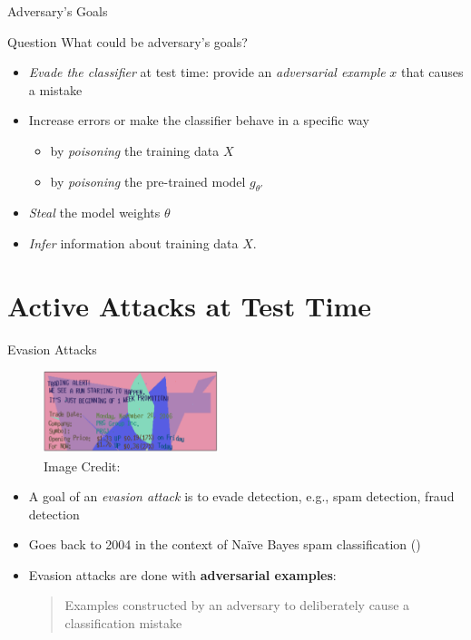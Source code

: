 \documentclass[10pt]{beamer}
\begin{document}
\begin{frame}[fragile]{Adversary's Goals}
  \centering
  

  \begin{alertblock}{Question}
    What could be adversary's goals?
  \end{alertblock}

  \pause

  \begin{itemize}[<+-| alert@+>]
    \item \emph{Evade the classifier} at test time: provide an \emph{adversarial example} $x$ that
      causes a mistake
    \pause
    \item Increase errors or make the classifier behave in a specific way
    \begin{itemize}
      \item by \emph{poisoning} the training data $X$
      \item by \emph{poisoning} the pre-trained model $g_{\theta'}$
    \end{itemize}
    \pause
    \item \emph{Steal} the model weights $\theta$
    \pause
    \item \emph{Infer} information about training data $X$.
  \end{itemize}

\end{frame}


\section{Active Attacks at Test Time}


\begin{frame}[fragile]{Evasion Attacks}
  \begin{figure}
    \includegraphics[width=2in]{spam.png} \\
    \footnotesize Image Credit: \cite{BiggioR18}
  \end{figure}

  \begin{itemize}[<+-| alert@+>]
    \item A goal of an \emph{evasion attack} is to evade detection, e.g., spam detection, fraud
      detection
    \item Goes back to 2004 in the context of Na\"ive Bayes spam classification (\cite{DalviDMSV04,
      LowdM05})
    \item Evasion attacks are done with \textbf{adversarial examples}:
      \begin{quote}
        Examples constructed by an adversary to deliberately cause a classification mistake
      \end{quote}
  \end{itemize}
\end{frame}
\end{document}
